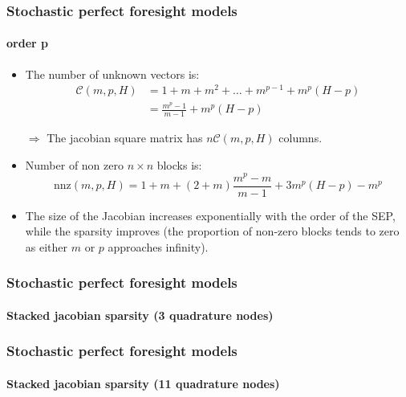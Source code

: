 \documentclass{beamer}
\begin{document}
\begin{frame}%
   \frametitle{Stochastic perfect foresight models}
   \framesubtitle{order p}

   \begin{itemize}

      \item The number of unknown vectors is:
            \[
               \begin{split}
                  \mathcal C(m,p,H) & = 1+m+m^2+\ldots+m^{p-1} + m^p(H-p) \\
                                    & = \frac{m^p-1}{m-1} + m^p(H-p)
               \end{split}
            \]

      \item[$\Rightarrow$] The jacobian square matrix has $n\mathcal C(m,p,H)$ columns.\newline

      \item Number of non zero $n\times n$ blocks is:
            \[
               \mathrm{nnz}(m,p,H) = 1+m+(2+m)\frac{m^p-m}{m-1}+3m^p(H-p)-m^p
            \]

      \item The size of the Jacobian increases exponentially with the order
            of the SEP, while the sparsity improves (the proportion of non-zero blocks tends to zero as either $m$ or $p$ approaches infinity).

   \end{itemize}

\end{frame}


\begin{frame}
   \frametitle{Stochastic perfect foresight models}
   \framesubtitle{Stacked jacobian sparsity (3 quadrature nodes)}
   \begin{center}
      \scalebox{.5}{
         }
   \end{center}

\end{frame}


\begin{frame}
   \frametitle{Stochastic perfect foresight models}
   \framesubtitle{Stacked jacobian sparsity (11 quadrature nodes)}
   \begin{center}
      \scalebox{.5}{
         }
   \end{center}

\end{frame}
\end{document}
